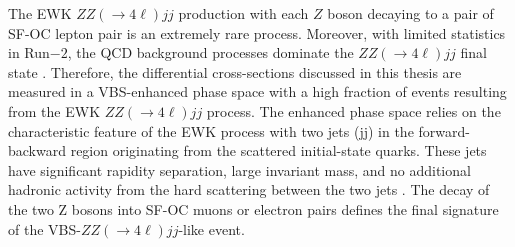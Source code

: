The EWK $ZZ( \rightarrow 4\ell ) jj$ production with each $Z$ boson decaying to a pair of SF-OC lepton pair is an extremely rare process. Moreover, with limited statistics in Run$-2$, the QCD background processes dominate the $ZZ( \rightarrow 4\ell ) jj$ final state \cite{ATLASZZjj}. Therefore, the differential cross-sections discussed in this thesis are measured in a VBS-enhanced phase space with a high fraction of events resulting from the EWK $ZZ( \rightarrow 4\ell ) jj$ process. The enhanced phase space relies on the characteristic feature of the EWK process with two jets (jj) in the forward-backward region originating from the scattered initial-state quarks. These jets have significant rapidity separation, large invariant mass, and no additional hadronic activity from the hard scattering between the two jets \cite{RapidityGapCite}. The decay of the two Z bosons into SF-OC muons or electron pairs defines the final signature of the VBS-$ZZ( \rightarrow 4\ell ) jj$-like event.
